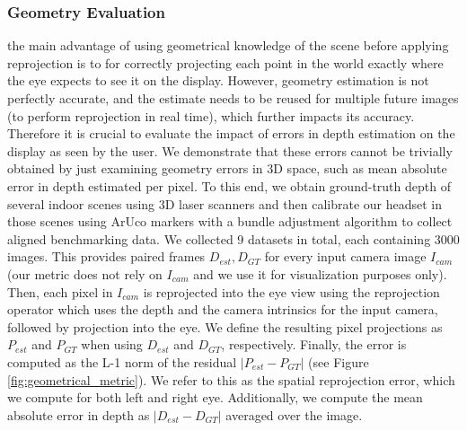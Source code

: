 

\subsubsection{Geometry Evaluation}
 the main advantage of using geometrical knowledge of the scene before applying reprojection is to  for correctly projecting each point in the world exactly where the eye expects to see it on the display. However, geometry estimation is not perfectly accurate, and the estimate needs to be reused for multiple future images (to perform reprojection in real time), which further impacts its accuracy. Therefore it is crucial to evaluate the impact of errors in depth estimation on the display as seen by the user. We demonstrate that these errors cannot be trivially obtained by just examining geometry errors in 3D space, such as mean absolute error in depth estimated per pixel. To this end, we obtain ground-truth depth of several indoor scenes using 3D laser scanners and then calibrate our headset in those scenes using ArUco \cite{aruco} markers with a bundle adjustment algorithm to collect aligned benchmarking data. We collected 9 datasets in total, each containing 3000 images. This provides paired frames $D_{est}, D_{GT}$ for every input camera image $I_{cam}$ (our metric does not rely on $I_{cam}$ and we use it for visualization purposes only). Then, each pixel in $I_{cam}$ is reprojected into the eye view using the reprojection operator which uses the depth and the camera intrinsics for the input camera, followed by projection into the eye. We define the resulting pixel projections as $P_{est}$ and $P_{GT}$ when using $D_{est}$ and $D_{GT}$, respectively. Finally, the error is computed as the L-1 norm of the residual $|P_{est} - P_{GT}|$ (see Figure \ref{fig:geometrical_metric}). We refer to this as the spatial reprojection error, which we compute for both left and right eye. Additionally, we compute the mean absolute error in depth as $|D_{est} - D_{GT}|$ averaged over the image.

